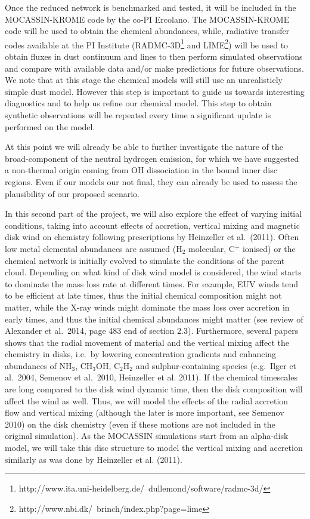 \documentclass[10pt,fleqn,twoside]{article}
\begin{document}
 Once the reduced network is benchmarked and tested, it will be included in the MOCASSIN-KROME code by the co-PI Ercolano. The MOCASSIN-KROME code will be used to obtain the chemical abundances, while, radiative transfer codes available at the PI Institute (RADMC-3D\footnote{http://www.ita.uni-heidelberg.de/~dullemond/software/radmc-3d/} and LIME\footnote{http://www.nbi.dk/~brinch/index.php?page=lime}) will be used to obtain fluxes in dust continuum and lines to then perform simulated observations and compare with available data and/or make predictions for future observations. We note that at this stage the chemical models will still use an unrealisticly simple dust model. However this step is important to guide us towards interesting diagnostics and to help us refine our chemical model. This step to obtain synthetic observations will be repeated every time a significant update is performed on the model. 

At this point we will already be able to further investigate the nature of the broad-component of the neutral hydrogen emission, for which we have suggested a non-thermal origin coming from OH dissociation in the bound inner disc regions. Even if our models our not final, they can already be used to assess the plausibility of our proposed scenario.

In this second part of the project, we will also explore the effect of
varying initial conditions, taking into account effects of accretion,
vertical mixing and magnetic disk wind on chemistry following
prescriptions by Heinzeller et al.\ (2011). Often low metal elemental
abundances are assumed (H$_2$ molecular, C$^+$ ionised) or the
chemical network is initially evolved to simulate the conditions of
the parent cloud.  Depending on what kind of disk wind model is
considered, the wind starts to dominate the mass loss rate at
different times. For example, EUV winds tend to be efficient at late
times, thus the initial chemical composition might not matter, while
the X-ray winds might dominate the mass loss over accretion in early
times, and thus the initial chemical abundances might matter (see
review of Alexander et al.\ 2014, page 483 end of section
2.3). Furthermore, several papers shows that the radial movement of
material and the vertical mixing affect the chemistry in disks,
i.e.\ by lowering concentration gradients and enhancing abundances of
NH$_3$, CH$_3$OH, C$_2$H$_2$ and sulphur-containing species
(e.g.\ Ilger et al.\ 2004, Semenov et al.\ 2010, Heinzeller et
al. 2011). If the chemical timescales are long compared to the disk
wind dynamic time, then the disk composition will affect the wind as
well. Thus, we will model the effects of the radial accretion flow and
vertical mixing (although the later is more important, see Semenov
2010) on the disk chemistry (even if these motions are not included in
the original simulation). As the MOCASSIN simulations start from an
alpha-disk model, we will take this disc structure to model the
vertical mixing and accretion similarly as was done by Heinzeller et
al. (2011). 
\end{document}
